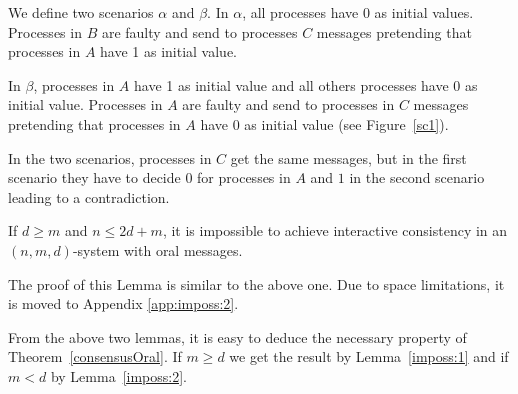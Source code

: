   We define two scenarios $\alpha$ and $\beta$.
  In $\alpha$, all processes have 0 as initial values.
  Processes in $B$ are faulty and send  to processes $C$ messages
  pretending that processes in $A$ have 1 as initial value.
  
  In $\beta$, processes in $A$ have 1 as initial value and all  others processes have 0 as initial value.
  Processes in $A$ are faulty and send to processes in $C$ messages 
  pretending that processes in $A$ have 0 as initial value (see Figure~\ref{sc1}).
  
  In the two scenarios, processes in $C$ get the same messages, but in the first scenario 
  they have to decide 0 for processes in $A$ and $1$ in the second scenario leading to a contradiction.


\begin{lemma}\label{imposs:2}
  If $d \geqslant m$ and $n \leqslant 2d+m$, it is impossible to achieve interactive consistency in an $(n,m,d)$-system with oral messages.\end{lemma}

The proof of this Lemma is similar to the above one. Due to space limitations, it is moved to Appendix \ref{app:imposs:2}.

From the above two lemmas, it is easy to deduce the necessary property of 
Theorem~\ref{consensusOral}. 
If $m \geqslant d$ we get the result by Lemma~\ref{imposs:1} and  if $m<d$ by Lemma~\ref{imposs:2}.





